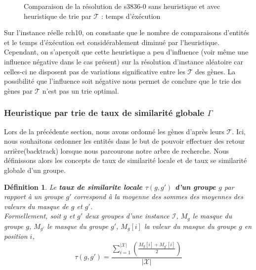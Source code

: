 \documentclass[a4paper,10pt]{article}
\newtheorem{definition}{Définition}
\begin{document}
\begin{figure}[H]
\begin{center}
\end{center}
\caption{Comparaison de la résolution de s3836-0 sans heuristique et avec heuristique de trie par $\mathcal{T}$ : temps d'éxécution}
\end{figure}


Sur l'instance réelle rch10, on constante que le nombre de comparaisons d'entités  et le temps d'éxécution est considérablement diminué par l'heuristique. Cependant, on s'aperçoit que cette heuristique a peu d'influence (voir même une influence négative dans le cas présent) sur la résolution d'instance aléatoire car celles-ci ne disposent pas de variations significative entre les $\mathcal{T}$ des gènes. La possibilité que l'influence soit négative nous permet de conclure que le trie des gènes par $\mathcal{T}$ n'est pas un trie optimal. 


\subsubsection{Heuristique par trie de taux de similarité globale $\Gamma$}
Lors de la précédente section, nous avons ordonné les gènes d'après leurs $\mathcal{T}$. Ici, nous souhaitons ordonner les entités dans le but de pouvoir effectuer des retour arrière(backtrack) lorsque nous parcourons notre arbre de recherche. Nous définissons alors les concepts de taux de similarité locale et de taux se similarité globale d'un groupe.

\begin{definition}
Le \textbf{taux de similarite locale $\tau(g,g')$ d'un groupe $g$} par rapport à un groupe $g'$ correspond à la moyenne des sommes des moyennes des valeurs du masque de $g$ et $g'$.\\
Formellement, soit $g$ et $g'$ deux groupes d'une instance $\mathcal{I}$, $M_g$ le masque du groupe $g$, $M_{g'}$ le masque du groupe $g'$, $M_g[i]$ la valeur du masque du groupe $g$ en position $i$,
$$ \tau(g,g')= \frac{\sum_{i=1}^{|\mathcal{X}|}(\frac{M_g[i]+M_{g'}[i]}{2})}{|\mathcal{X}|}$$
\end{definition}
\end{document}
